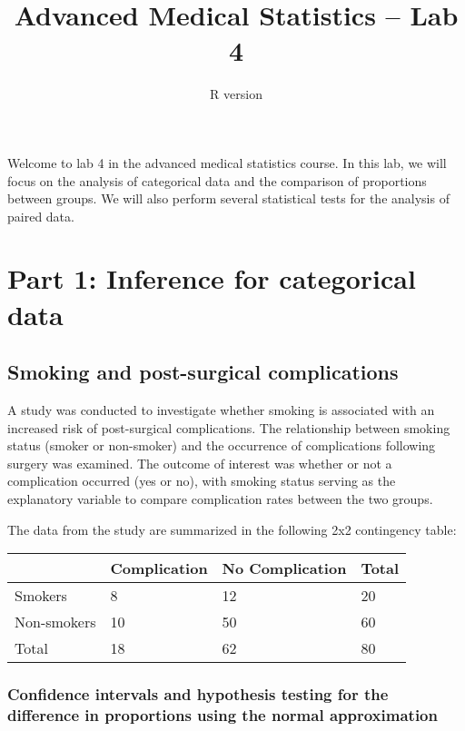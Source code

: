 \documentclass[
  letterpaper,
  DIV=11,
  numbers=noendperiod]{scrartcl}
\title{Advanced Medical Statistics -- Lab 4}
\subtitle{R version}
\author{}
\date{}
\begin{document}
\maketitle


Welcome to lab 4 in the advanced medical statistics course. In this lab,
we will focus on the analysis of categorical data and the comparison of
proportions between groups. We will also perform several statistical
tests for the analysis of paired data.

\section{Part 1: Inference for categorical
data}\label{part-1-inference-for-categorical-data}

\subsection{Smoking and post-surgical
complications}\label{smoking-and-post-surgical-complications}

A study was conducted to investigate whether smoking is associated with
an increased risk of post-surgical complications. The relationship
between smoking status (smoker or non-smoker) and the occurrence of
complications following surgery was examined. The outcome of interest
was whether or not a complication occurred (yes or no), with smoking
status serving as the explanatory variable to compare complication rates
between the two groups.

The data from the study are summarized in the following 2x2 contingency
table:

\begin{longtable}[]{@{}llll@{}}
\toprule\noalign{}
& Complication & No Complication & Total \\
\midrule\noalign{}
\endhead
\bottomrule\noalign{}
\endlastfoot
Smokers & 8 & 12 & 20 \\
Non-smokers & 10 & 50 & 60 \\
Total & 18 & 62 & 80 \\
\end{longtable}

\subsubsection{Confidence intervals and hypothesis testing for the
difference in proportions using the normal
approximation}\label{confidence-intervals-and-hypothesis-testing-for-the-difference-in-proportions-using-the-normal-approximation}
\end{document}
